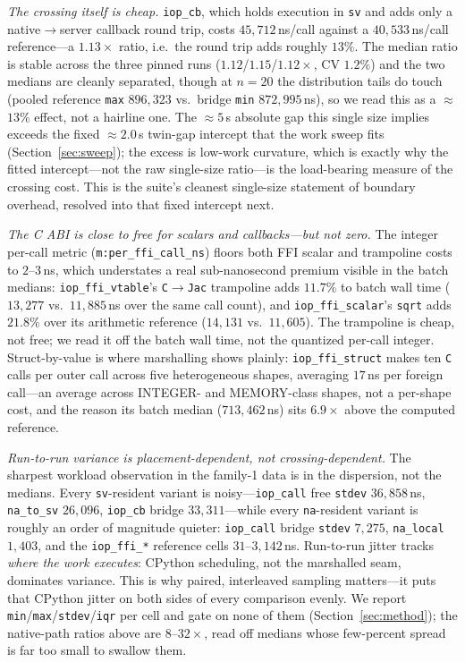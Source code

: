 \documentclass[conference]{IEEEtran}
\newcommand{\code}[1]{\texttt{#1}}
\begin{document}
\emph{The crossing itself is cheap.} \code{iop\_cb}, which holds execution in
\code{sv} and adds only a native$\rightarrow$server callback round trip, costs
$45{,}712$\,ns/call against a $40{,}533$\,ns/call reference---a $1.13\times$
ratio, i.e.\ the round trip adds roughly $13\%$. The median ratio is stable
across the three pinned runs ($1.12$/$1.15$/$1.12\times$, CV $1.2\%$) and the two
medians are cleanly separated, though at $n{=}20$ the distribution tails do touch
(pooled reference \code{max} $896{,}323$ vs.\ bridge \code{min} $872{,}995$\,ns),
so we read this as a $\approx$$13\%$ effect, not a hairline one. The $\approx$$5$\,\textmu s
absolute gap this single size implies exceeds the fixed $\approx$$2.0$\,\textmu s
twin-gap intercept that the work sweep fits (Section~\ref{sec:sweep}); the excess
is low-work curvature, which is exactly why the fitted intercept---not the raw
single-size ratio---is the load-bearing measure of the crossing cost. This is the
suite's cleanest single-size statement of boundary overhead, resolved into that
fixed intercept next.

\emph{The C ABI is close to free for scalars and callbacks---but not zero.} The
integer per-call metric (\code{m:per\_ffi\_call\_ns}) floors both FFI scalar and
trampoline costs to $2$--$3$\,ns, which understates a real sub-nanosecond
premium visible in the batch medians: \code{iop\_ffi\_vtable}'s
\code{C$\rightarrow$Jac} trampoline adds $11.7\%$ to batch wall time
($13{,}277$ vs.\ $11{,}885$\,ns over the same call count), and
\code{iop\_ffi\_scalar}'s \code{sqrt} adds $21.8\%$ over its arithmetic reference
($14{,}131$ vs.\ $11{,}605$). The trampoline is cheap, not free; we read it off
the batch wall time, not the quantized per-call integer. Struct-by-value is
where marshalling shows plainly: \code{iop\_ffi\_struct} makes ten \code{C} calls
per outer call across five heterogeneous shapes, averaging $17$\,ns per foreign
call---an average across INTEGER- and MEMORY-class shapes, not a per-shape cost,
and the reason its batch median ($713{,}462$\,ns) sits $6.9\times$ above the
computed reference.

\emph{Run-to-run variance is placement-dependent, not crossing-dependent.} The
sharpest workload observation in the family-1 data is in the dispersion, not the
medians. Every \code{sv}-resident variant is noisy---\code{iop\_call} free
\code{stdev} $36{,}858$\,ns, \code{na\_to\_sv} $26{,}096$, \code{iop\_cb} bridge
$33{,}311$---while every \code{na}-resident variant is roughly an order of
magnitude quieter: \code{iop\_call} bridge \code{stdev} $7{,}275$,
\code{na\_local} $1{,}403$, and the \code{iop\_ffi\_*} reference cells
$31$--$3{,}142$\,ns. Run-to-run jitter tracks \emph{where the work executes}:
CPython scheduling, not the marshalled seam, dominates variance. This is why
paired, interleaved sampling matters---it puts that CPython jitter on both sides
of every comparison evenly. We report \code{min}/\code{max}/\code{stdev}/\code{iqr}
per cell and gate on none of them (Section~\ref{sec:method}); the native-path
ratios above are $8$--$32\times$, read off medians whose few-percent spread is far
too small to swallow them.
\end{document}
